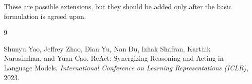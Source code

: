\documentclass[11pt]{article}
\begin{document}
These are possible extensions, but they should be added only after the basic formulation is agreed upon.

\begin{thebibliography}{9}

Shunyu Yao, Jeffrey Zhao, Dian Yu, Nan Du, Izhak Shafran, Karthik Narasimhan, and Yuan Cao.
\newblock ReAct: Synergizing Reasoning and Acting in Language Models.
\newblock \emph{International Conference on Learning Representations (ICLR)}, 2023.

\end{thebibliography}
\end{document}
